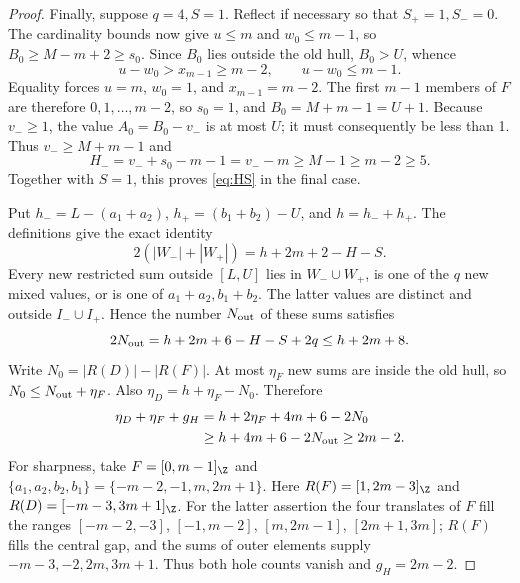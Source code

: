 \begin{proof}
Finally, suppose $q=4,S=1$. Reflect if necessary so that
$S_+=1,S_-=0$. The cardinality bounds now give $u\le m$ and
$w_0\le m-1$, so $B_0\ge M-m+2\ge s_0$. Since $B_0$ lies outside the
old hull, $B_0>U$, whence
\[
 u-w_0>x_{m-1}\ge m-2,\qquad u-w_0\le m-1.
\]
Equality forces $u=m$, $w_0=1$, and $x_{m-1}=m-2$. The first $m-1$
members of $F$ are therefore $0,1,\ldots,m-2$, so $s_0=1$, and
$B_0=M+m-1=U+1$. Because $v_-\ge1$, the value $A_0=B_0-v_-$ is at most
$U$; it must consequently be less than 1. Thus $v_-\ge M+m-1$ and
\[
 H_-=v_-+s_0-m-1=v_--m\ge M-1\ge m-2\ge5.
\]
Together with $S=1$, this proves \eqref{eq:HS} in the final case.

Put $h_-=L-(a_1+a_2)$, $h_+=(b_1+b_2)-U$, and $h=h_-+h_+$.
The definitions give the exact identity
\[
 2(|W_-|+|W_+|)=h+2m+2-H-S.
\]
Every new restricted sum outside $[L,U]$ lies in $W_-\cup W_+$, is one
of the $q$ new mixed values, or is one of $a_1+a_2,b_1+b_2$. The latter
values are distinct and outside $I_-\cup I_+$. Hence the number $N_{\rm out}$
of these sums satisfies
\[
 2N_{\rm out}=h+2m+6-H-S+2q\le h+2m+8.
\]
Write $N_0=|R(D)|-|R(F)|$. At most $\eta_F$ new sums are inside the old
hull, so $N_0\le N_{\rm out}+\eta_F$. Also
$\eta_D=h+\eta_F-N_0$. Therefore
\begin{align*}
 \eta_D+\eta_F+g_H
 &=h+2\eta_F+4m+6-2N_0\\
 &\ge h+4m+6-2N_{\rm out}\ge2m-2.
\end{align*}
For sharpness, take $F=[0,m-1]_{\Z}$ and
$\{a_1,a_2,b_2,b_1\}=\{-m-2,-1,m,2m+1\}$.
Here $R(F)=[1,2m-3]_{\Z}$ and $R(D)=[-m-3,3m+1]_{\Z}$.
For the latter assertion the four translates of $F$ fill the ranges
$[-m-2,-3]$, $[-1,m-2]$, $[m,2m-1]$, $[2m+1,3m]$;
$R(F)$ fills the central gap, and the sums of outer elements supply
$-m-3,-2,2m,3m+1$. Thus both hole counts vanish and $g_H=2m-2$.
\end{proof}

